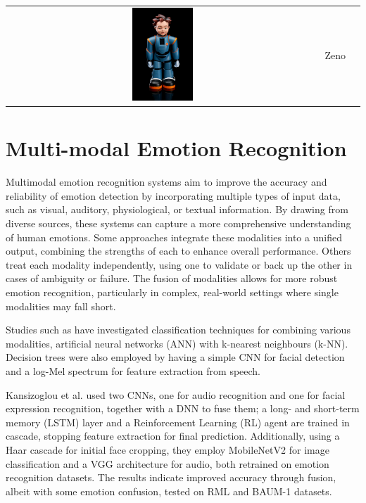 \begin{table}[ht]
{\begin{tabularx}{1.3\textwidth}{ c|X|X| }
\cline{2-3}
\includegraphics[width=0.2\textwidth]{robot_table/Zeno.png} & Zeno    & \cite{8578328} \\
\cline{2-3}
\end{tabularx}
}
\end{table}
\clearpage{}

\section{Multi-modal Emotion Recognition}
Multimodal emotion recognition systems aim to improve the accuracy and reliability of emotion detection by incorporating multiple types of input data, such as visual, auditory, physiological, or textual information. By drawing from diverse sources, these systems can capture a more comprehensive understanding of human emotions. Some approaches integrate these modalities into a unified output, combining the strengths of each to enhance overall performance. Others treat each modality independently, using one to validate or back up the other in cases of ambiguity or failure. The fusion of modalities allows for more robust emotion recognition, particularly in complex, real-world settings where single modalities may fall short.

Studies such as \cite{Song2018-vu} have investigated classification techniques for combining various modalities, artificial neural networks (ANN) with k-nearest neighbours (k-NN). Decision trees were also employed by \cite{Adiga2020-wv} having a simple CNN for facial detection and a log-Mel spectrum for feature extraction from speech.

Kansizoglou et al. \cite{Kansizoglou2022-ih} used two CNNs, one for audio recognition and one for facial expression recognition, together with a DNN to fuse them; a long- and short-term memory (LSTM) layer and a Reinforcement Learning (RL) agent are trained in cascade, stopping feature extraction for final prediction. Additionally, using a Haar cascade for initial face cropping, they employ MobileNetV2 for image classification and a VGG architecture for audio, both retrained on emotion recognition datasets. The results indicate improved accuracy through fusion, albeit with some emotion confusion, tested on RML and BAUM-1 datasets.

